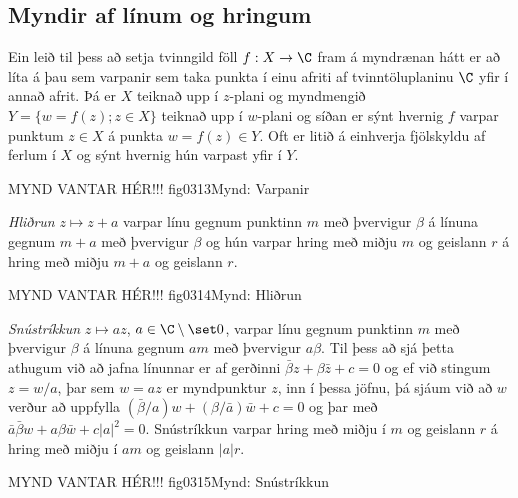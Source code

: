 \subsection*{Myndir af línum og hringum}

Ein  leið til þess að setja tvinngild föll
$f:X\to \C$ fram á myndrænan hátt
er að líta á þau sem varpanir sem taka punkta í einu afriti af
tvinntöluplaninu $\C$ yfir í annað afrit.  Þá er $X$ teiknað upp í
$z$-plani og myndmengið $Y=\{w=f(z); z\in X\}$ 
teiknað upp í $w$-plani og síðan er sýnt
hvernig $f$ varpar punktum $z\in X$ á punkta $w=f(z)\in Y$.
Oft er litið á einhverja fjölskyldu af ferlum í $X$ og sýnt hvernig hún
varpast yfir í $Y$. 


MYND VANTAR HÉR!!! {fig0313}{Mynd: Varpanir}


\smallskip\noindent
{\it Hliðrun}  $z\mapsto z+a$ varpar línu gegnum punktinn $m$ með
þvervigur ${\beta}$  á línuna gegnum $m+a$ með þvervigur ${\beta}$ og
hún varpar hring með miðju $m$ og geislann $r$ á hring með miðju $m+a$
og geislann $r$.



MYND VANTAR HÉR!!! {fig0314}{Mynd: Hliðrun}


\smallskip\noindent
{\it Snústríkkun}
$z\mapsto az$, $a\in \C\setminus \set 0$, varpar línu gegnum
punktinn $m$ með þvervigur ${\beta}$  á línuna gegnum $am$ með
þvervigur $a{\beta}$. Til þess að sjá þetta athugum við að jafna
línunnar er af gerðinni $\bar {\beta} z+{\beta}\bar z+c=0$ og ef við
stingum $z=w/a$, þar sem $w=az$ er myndpunktur $z$, inn í þessa
jöfnu, þá sjáum við að $w$ verður að uppfylla
$(\bar {\beta}/a) w+({\beta}/\bar a)\bar w+c=0$ og þar með
$\bar a\bar {\beta} w+a{\beta}\bar w+c|a|^2=0$.  
Snústríkkun varpar hring með miðju í $m$ og geislann $r$ á hring með
miðju í $am$ og geislann $|a|r$.


MYND VANTAR HÉR!!! {fig0315}{Mynd: Snústríkkun}



